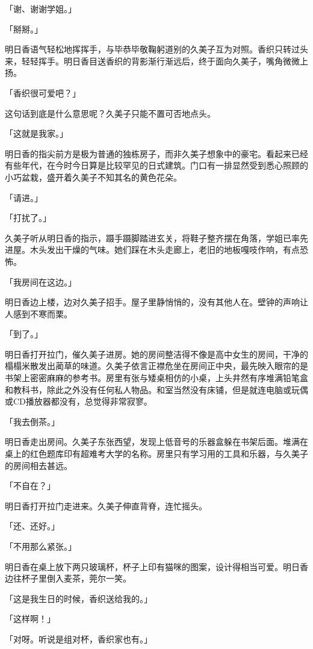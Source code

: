 \documentclass[UTF8]{ctexart}
\begin{document}
    「谢、谢谢学姐。」 

    「掰掰。」 

    明日香语气轻松地挥挥手，与毕恭毕敬鞠躬道别的久美子互为对照。香织只转过头来，轻轻挥手。明日香目送香织的背影渐行渐远后，终于面向久美子，嘴角微微上扬。 

    「香织很可爱吧？」 

    这句话到底是什么意思呢？久美子只能不置可否地点头。 

    「这就是我家。」 

    明日香的指尖前方是极为普通的独栋房子，而非久美子想象中的豪宅。看起来已经有些年代，在今时今日算是比较罕见的日式建筑。门口有一排显然受到悉心照顾的小巧盆栽，盛开着久美子不知其名的黄色花朵。 

    「请进。」 

    「打扰了。」 

    久美子听从明日香的指示，蹑手蹑脚踏进玄关，将鞋子整齐摆在角落，学姐已率先进屋。木头发出干燥的气味。她们踩在木头走廊上，老旧的地板嘎吱作响，有点恐怖。 

    「我房间在这边。」 

    明日香边上楼，边对久美子招手。屋子里静悄悄的，没有其他人在。壁钟的声响让人感到不寒而栗。 

    「到了。」 

    明日香打开拉门，催久美子进房。她的房间整洁得不像是高中女生的房间，干净的榻榻米散发出蔺草的味道。久美子依言正襟危坐在房间正中央，最先映入眼帘的是书架上密密麻麻的参考书。房里有张与矮桌相仿的小桌，上头井然有序堆满铅笔盒和教科书，除此之外没有任何私人物品。和室当然没有床铺，但是就连电脑或玩偶或CD播放器都没有，总觉得非常寂寥。 

    「我去倒茶。」 

    明日香走出房间。久美子东张西望，发现上低音号的乐器盒躲在书架后面。堆满在桌上的红色题库印有超难考大学的名称。房里只有学习用的工具和乐器，与久美子的房间相去甚远。 

    「不自在？」 

    明日香打开拉门走进来。久美子伸直背脊，连忙摇头。 

    「还、还好。」 

    「不用那么紧张。」 

    明日香在桌上放下两只玻璃杯，杯子上印有猫咪的图案，设计得相当可爱。明日香边往杯子里倒入麦茶，莞尔一笑。 

    「这是我生日的时候，香织送给我的。」 

    「这样啊！」 

    「对呀。听说是组对杯，香织家也有。」 
\end{document}
